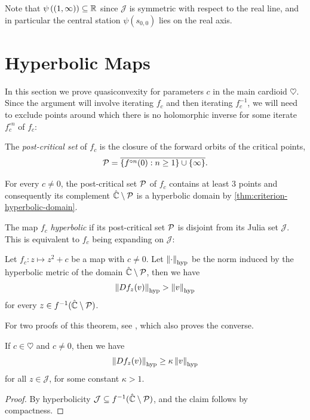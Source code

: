 Note that $\psi\left((1,\infty)\right)\subseteq\mathbb{R}$ since $\mathcal{J}$ is symmetric with respect to the real line, and in particular the central station $\psi(s_{0,0})$ lies on the real axis.


\section{Hyperbolic Maps}
In this section we prove quasiconvexity for parameters $c$ in the main cardioid $\heartsuit$.
Since the argument will involve iterating $f_c$ and then iterating $f_c^{-1}$, 
we will need to exclude points around which there is no holomorphic inverse for some iterate $f_c^{\circ n}$ of $f_c$:

\begin{definition}
	The \emph{post-critical set} of $f_c$ is the closure of the forward orbits 
	of the critical points,
	\begin{equation*}
		\operatorname{\mathcal P} = \overline{\{f^{\circ n} (0): n \geq 1\} \cup \{\infty\}}.
	\end{equation*}	
\end{definition}
For every $c \neq 0$, the post-critical set $\operatorname{\mathcal P}$ of $f_c$ contains at least $3$ points 
and consequently its complement $\hat{\mathbb C} \setminus \operatorname{\mathcal P}$
is a hyperbolic domain by \cref{thm:criterion-hyperbolic-domain}.

The map $f_c$ \emph{hyperbolic} if
 its post-critical set $\operatorname{\mathcal P}$ is disjoint from its Julia set $\mathcal J$.
 This is equivalent to $f_c$ being expanding on $\mathcal J$:

 \begin{theorem}\label{theorem:hyperbolic_expanding}
Let $f_c: z\mapsto z^2+c$  be a map with $c \neq0$. 
Let $\left\Vert \cdot\right\Vert_{\mathrm{hyp}}$ be the norm induced by the hyperbolic metric of the domain 
$\hat {\mathbb C} \setminus \operatorname{\mathcal P}$, 
then we have 
\begin{equation}\label{eq:hyp-derivative-bound}
	\left\Vert Df_z(v)\right\Vert_\mathrm{hyp} > \left\Vert v\right\Vert_\mathrm{hyp}
\end{equation} 
for every $z\in f^{-1}(\hat {\mathbb C} \setminus \operatorname{\mathcal P})$.
 \end{theorem}
 For two proofs of this theorem, see \cite[Theorem 19.1]{milnor_book}, which also proves the converse.

\begin{corollary}
	If $c \in \heartsuit$ and $c \neq 0$, then we have 
	\begin{equation}
		\left\Vert Df_z(v)\right\Vert_\mathrm{hyp} \geq \kappa \left\Vert v\right\Vert_\mathrm{hyp}
	\end{equation} 
	for all $z \in \mathcal J$, for some constant $\kappa >1$.
\end{corollary}
\begin{proof}
	By hyperbolicity 
	$ \mathcal J \subseteq f^{-1}(\hat {\mathbb C} \setminus \operatorname{\mathcal P})$, 
	and the claim follows by compactness.
\end{proof} 
 
